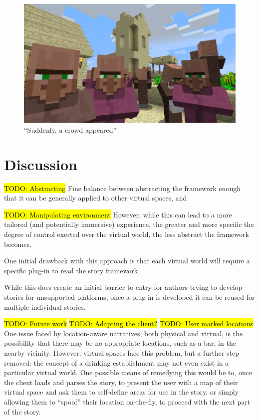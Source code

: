 \documentclass{acm}
\newcommand{\TODO}[1]{\hl{TODO: #1}}
\begin{document}
\begin{figure}
\centering
\includegraphics[scale=0.24]{./figures/villagers.png}
\caption{``Suddenly, a crowd appeared''}
\label{figure:villagers}
\end{figure}


\section{Discussion}
\TODO{Abstracting}
Fine balance between abstracting the framework enough that it can be generally applied to other virtual spaces, and 


\TODO{Manipulating environment}
However, while this can lead to a more tailored (and potentially immersive) experience, the greater and more specific the degree of control exerted over the virtual world, the less abstract the framework becomes.

One initial drawback with this approach is that each virtual world will require a specific plug-in to read the story framework, 

While this does create an initial barrier to entry for authors trying to develop stories for unsupported platforms, once a plug-in is developed it can be reused for multiple individual stories.

\TODO{Future work}
\TODO{Adapting the client?}
\TODO{User marked locations}
One issue faced by location-aware narratives, both physical and virtual, is the possibility that there may be no appropriate locations, such as a bar, in the nearby vicinity. However, virtual spaces face this problem, but a further step removed: the concept  of a drinking establishment may not even exist in a particular virtual world. One possible means of remedying this would be to, once the client loads and parses the story, to present the user with a map of their virtual space and ask them to self-define areas for use in the story, or simply allowing them to ``spoof'' their location on-the-fly, to proceed with the next part of the story.
\end{document}
